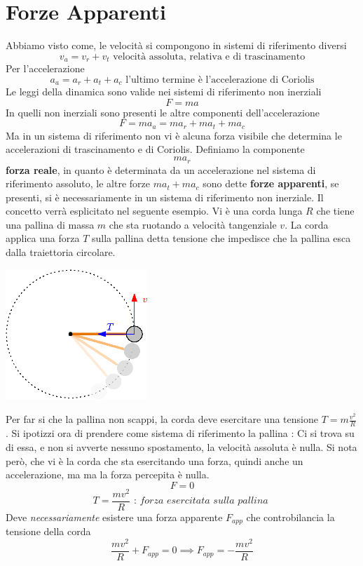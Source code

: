 \documentclass[10pt, letterpaper]{report}
\begin{document}
\section{Forze Apparenti}
Abbiamo visto come, le velocità si compongono in sistemi di riferimento diversi 
$$ v_a=v_r+v_t \text{ velocità assoluta, relativa e di trascinamento}$$
Per l'accelerazione 
$$ a_a=a_r+a_t+a_c \text{ l'ultimo termine è l'accelerazione di Coriolis}$$
Le leggi della dinamica sono valide nei sistemi di riferimento non inerziali 
$$ F=ma$$
In quelli non inerziali sono presenti le altre componenti dell'accelerazione
$$ F=ma_a=ma_r+ma_t+ma_c$$
Ma in un sistema di riferimento non vi è alcuna forza visibile che determina le accelerazioni 
di trascinamento e di Coriolis. Definiamo la componente 
$$ ma_r$$ 
\textbf{forza reale}, in quanto è determinata da un accelerazione nel sistema di riferimento assoluto, le 
altre forze $ma_t+ma_c$ sono dette \textbf{forze apparenti}, se presenti, si è necessariamente in un 
sistema di riferimento non inerziale. Il concetto verrà esplicitato nel seguente esempio.\acc 
Vi è una corda lunga $R$ che tiene una pallina di massa $m$ che sta ruotando a velocità tangenziale $v$. La 
corda applica una forza $T$ sulla pallina detta tensione che impedisce che la pallina esca dalla traiettoria circolare.\begin{center}
    \includegraphics[width=0.4\textwidth]{images/forzaCent.eps}
\end{center}
Per far si che la pallina non scappi, la corda deve esercitare una tensione $T=m\frac{v^2}{R}$. Si ipotizzi ora 
di prendere come sistema di riferimento la pallina : Ci si trova su di essa, e non si avverte nessuno spostamento, 
la velocità assoluta è nulla. Si nota però, che vi è la corda che sta esercitando una forza, quindi anche un accelerazione, ma 
ma la forza percepita è nulla. 
$$ F=0$$
$$ T = \frac{mv^2}{R}\textit{ : forza esercitata sulla pallina }$$
Deve \textit{necessariamente} esistere una forza apparente $F_{app}$ che controbilancia la tensione della corda 
$$ \frac{mv^2}{R} + F_{app} = 0 \implies F_{app}=-\frac{mv^2}{R} $$
\end{document}
